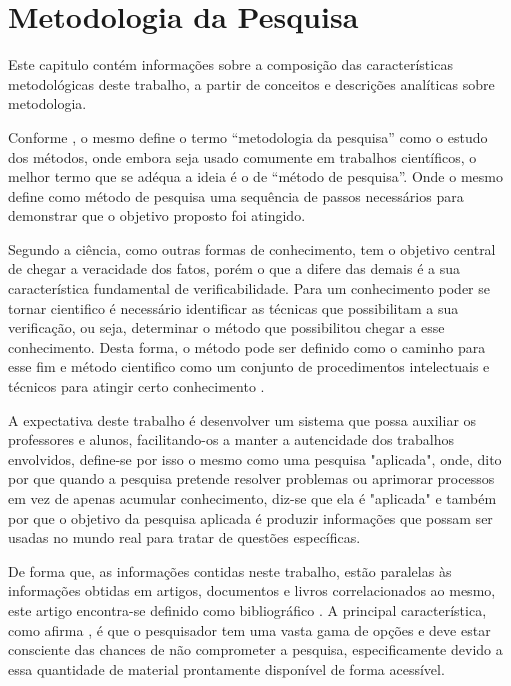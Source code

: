 \chapter{Metodologia da Pesquisa}\label{ch:metodologia-da-pesquisa}

Este capitulo contém informações sobre a composição das
características metodológicas deste trabalho, a partir de conceitos e
descrições analíticas sobre metodologia.

Conforme \textcite{wazlawick2009}, o mesmo define o termo
“metodologia da pesquisa” como o estudo dos métodos, onde embora
seja usado comumente em trabalhos científicos, o melhor termo que
se adéqua a ideia é o de “método de pesquisa”.
Onde o mesmo define como método de pesquisa uma sequência de passos
necessários para demonstrar que o objetivo proposto foi atingido.

Segundo \textcite{gil2017} a ciência, como outras formas de
conhecimento, tem o objetivo central de chegar a veracidade dos
fatos, porém o que a difere das demais é a sua característica
fundamental de verificabilidade.
Para um conhecimento poder se tornar cientifico é necessário
identificar as técnicas que possibilitam a sua verificação, ou seja,
determinar o método que possibilitou chegar a esse conhecimento.
Desta forma, o método pode ser definido como o caminho para esse fim
e método cientifico como um conjunto de procedimentos intelectuais
e técnicos para atingir certo conhecimento \cite{gil2017}.

A expectativa deste trabalho é desenvolver um sistema
que possa auxiliar os professores e alunos, facilitando-os a manter
a autencidade dos trabalhos envolvidos, define-se por isso o mesmo
como uma pesquisa "aplicada", onde, dito por \textcite{gil2017} que
quando a pesquisa pretende resolver problemas ou aprimorar processos
em vez de apenas acumular conhecimento, diz-se que ela é "aplicada"
e também por \textcite{prodanov2013} que o objetivo da pesquisa
aplicada é produzir informações que possam ser usadas no mundo real
para tratar de questões específicas.

De forma que, as informações contidas neste trabalho, estão paralelas
às informações obtidas em artigos, documentos e livros correlacionados
ao mesmo, este artigo encontra-se definido como bibliográfico \cite{
    prodanov2013}.
A principal característica, como afirma \textcite{gil2017}, é que o
pesquisador tem uma vasta gama de opções e deve estar consciente das
chances de não comprometer a pesquisa, especificamente devido a essa
quantidade de material prontamente disponível de forma acessível.


